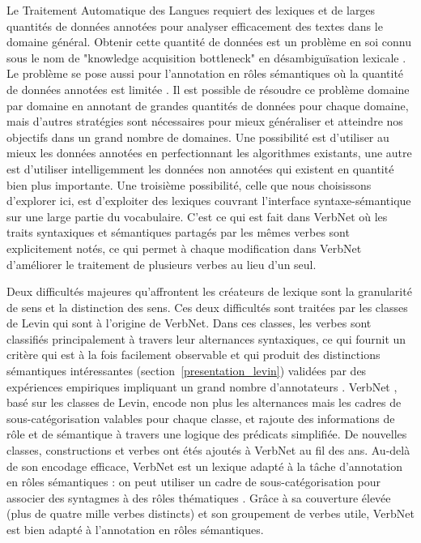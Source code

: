 Le Traitement Automatique des Langues requiert des lexiques et de larges
quantités de données annotées pour analyser efficacement des textes dans le
domaine général. Obtenir cette quantité de données est un problème en soi connu
sous le nom de "knowledge acquisition bottleneck" en désambiguïsation lexicale
\citep{gale1992method,navigli2009word}. Le problème se pose aussi pour
l'annotation en rôles sémantiques où la quantité de données annotées est
limitée \citep[section 1]{das2012structure}. Il est possible de résoudre ce
problème domaine par domaine en annotant de grandes quantités de données pour
chaque domaine, mais d'autres stratégies sont nécessaires pour mieux
généraliser et atteindre nos objectifs dans un grand nombre de domaines. Une
possibilité est d'utiliser au mieux les données annotées en perfectionnant les
algorithmes existants, une autre est d'utiliser intelligemment les données non
annotées qui existent en quantité bien plus importante. Une troisième
possibilité, celle que nous choisissons d'explorer ici, est d'exploiter des
lexiques couvrant l'interface syntaxe-sémantique sur une large partie du
vocabulaire. C'est ce qui est fait dans VerbNet où les traits syntaxiques et
sémantiques partagés par les mêmes verbes sont explicitement notés, ce qui
permet à chaque modification dans VerbNet d'améliorer le traitement de
plusieurs verbes au lieu d'un seul.


Deux difficultés majeures qu'affrontent les créateurs de lexique sont la
granularité de sens et la distinction des sens. Ces deux difficultés sont
traitées par les classes de Levin \citep{levin1993english} qui sont à l'origine
de VerbNet. Dans ces classes, les verbes sont classifiés principalement à
travers leur alternances syntaxiques, ce qui fournit un critère qui est à la
fois facilement observable et qui produit des distinctions sémantiques
intéressantes (section~\ref{presentation_levin}) validées par des expériences
empiriques impliquant un grand nombre d'annotateurs
\citep{hartshorne2014verbcorner}.  VerbNet \citep{kipperschuler2005verbnet},
basé sur les classes de Levin, encode non plus les alternances mais les cadres
de sous-catégorisation valables pour chaque classe, et rajoute des informations
de rôle et de sémantique à travers une logique des prédicats simplifiée. De
nouvelles classes, constructions et verbes ont étés ajoutés à VerbNet au fil
des ans. Au-delà de son encodage efficace, VerbNet est un lexique adapté à la
tâche d'annotation en rôles sémantiques : on peut utiliser un cadre de
sous-catégorisation pour associer des syntagmes à des rôles thématiques
\citep{swier2005exploiting,pradet2013revisiting}. Grâce à sa couverture élevée
(plus de quatre mille verbes distincts) et son groupement de verbes utile,
VerbNet est bien adapté à l'annotation en rôles sémantiques.

